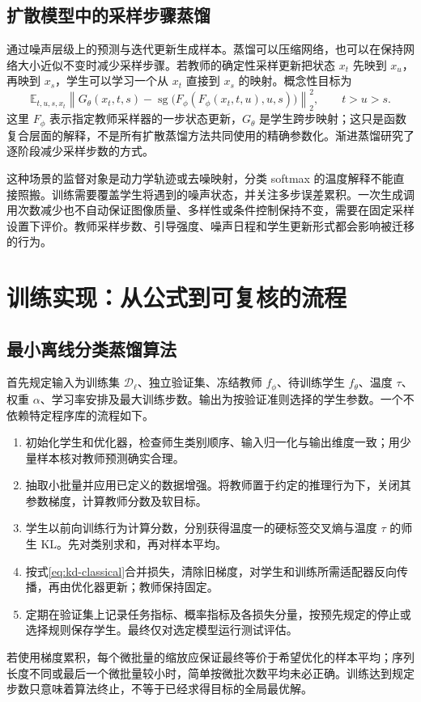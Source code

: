 \documentclass[UTF8,12pt,a4paper,fontset=fandol]{ctexart}
\begin{document}
\subsection{扩散模型中的采样步骤蒸馏}
通过噪声层级上的预测与迭代更新生成样本。蒸馏可以压缩网络，也可以在保持网络大小近似不变时减少采样步骤。若教师的确定性采样更新把状态 $x_t$ 先映到 $x_u$，再映到 $x_s$，学生可以学习一个从 $x_t$ 直接到 $x_s$ 的映射。概念性目标为
\[
 \mathbb E_{t,u,s,x_t}\left\|
 G_\theta(x_t,t,s)-\operatorname{sg}
 \bigl(F_\phi(F_\phi(x_t,t,u),u,s)\bigr)\right\|_2^2,
 \qquad t>u>s.
\]
这里 $F_\phi$ 表示指定教师采样器的一步状态更新，$G_\theta$ 是学生跨步映射；这只是函数复合层面的解释，不是所有扩散蒸馏方法共同使用的精确参数化。渐进蒸馏研究了逐阶段减少采样步数的方式\cite{salimans2022}。

这种场景的监督对象是动力学轨迹或去噪映射，分类 softmax 的温度解释不能直接照搬。训练需要覆盖学生将遇到的噪声状态，并关注多步误差累积。一次生成调用次数减少也不自动保证图像质量、多样性或条件控制保持不变，需要在固定采样设置下评价。教师采样步数、引导强度、噪声日程和学生更新形式都会影响被迁移的行为。

\section{训练实现：从公式到可复核的流程}
\label{sec:kd-implementation}

\subsection{最小离线分类蒸馏算法}
首先规定输入为训练集 $\mathcal D_\ell$、独立验证集、冻结教师 $f_\phi$、待训练学生 $f_\theta$、温度 $\tau$、权重 $\alpha$、学习率安排及最大训练步数。输出为按验证准则选择的学生参数。一个不依赖特定程序库的流程如下。
\begin{enumerate}
 \item 初始化学生和优化器，检查师生类别顺序、输入归一化与输出维度一致；用少量样本核对教师预测确实合理。
 \item 抽取小批量并应用已定义的数据增强。将教师置于约定的推理行为下，关闭其参数梯度，计算教师分数及软目标。
 \item 学生以前向训练行为计算分数，分别获得温度一的硬标签交叉熵与温度 $\tau$ 的师生 KL。先对类别求和，再对样本平均。
 \item 按式\eqref{eq:kd-classical}合并损失，清除旧梯度，对学生和训练所需适配器反向传播，再由优化器更新；教师保持固定。
 \item 定期在验证集上记录任务指标、概率指标及各损失分量，按预先规定的停止或选择规则保存学生。最终仅对选定模型运行测试评估。
\end{enumerate}
若使用梯度累积，每个微批量的缩放应保证最终等价于希望优化的样本平均；序列长度不同或最后一个微批量较小时，简单按微批次数平均未必正确。训练达到规定步数只意味着算法终止，不等于已经求得目标的全局最优解。
\end{document}
